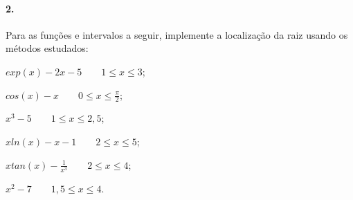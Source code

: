 \documentclass{article}
\begin{document}
\paragraph{2.} Para as funções e intervalos a seguir, implemente a localização da raiz
usando os métodos estudados:

\begin{enumerate}[a)]
	\begin{minipage}{0.5\textwidth}
	\item $exp(x) -2x -5\qquad 1\leq x\leq 3$;
	\item $cos(x)-x\qquad 0\leq x\leq\frac{\pi}{2}$; 
	\item $x^3-5\qquad 1\leq x \leq 2,5$;
	\end{minipage}
	\begin{minipage}{0.5\textwidth}
	\item $xln(x)-x-1\qquad 2\leq x\leq 5 $;
	\item $xtan(x)-\frac{1}{x^3}\qquad 2\leq x\leq 4$;
	\item $x^2-7\qquad 1,5\leq x\leq 4$.
	\end{minipage}
\end{enumerate}



\end{document}
